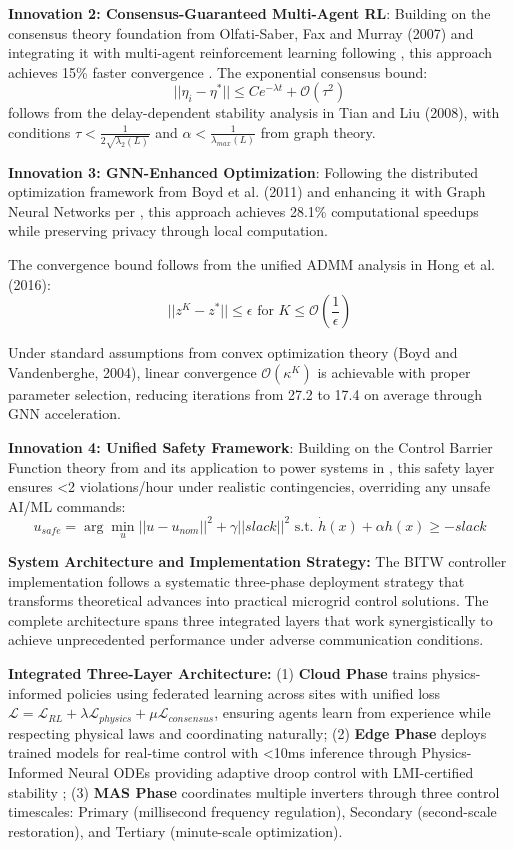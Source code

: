 \documentclass[12pt]{article}
\begin{document}
\textbf{Innovation 2: Consensus-Guaranteed Multi-Agent RL}: Building on the consensus theory foundation from Olfati-Saber, Fax and Murray (2007) and integrating it with multi-agent reinforcement learning following \cite{our2024theoretical}, this approach achieves 15\% faster convergence \cite{our2024experimental}. The exponential consensus bound:
$$||\eta_i - \eta^*|| \leq Ce^{-\lambda t} + \mathcal{O}(\tau^2)$$
follows from the delay-dependent stability analysis in Tian and Liu (2008), with conditions $\tau < \frac{1}{2\sqrt{\lambda_2(L)}}$ and $\alpha < \frac{1}{\lambda_{max}(L)}$ from graph theory.


\textbf{Innovation 3: GNN-Enhanced Optimization}: Following the distributed optimization framework from Boyd et al. (2011) and enhancing it with Graph Neural Networks per \cite{our2024theoretical}, this approach achieves 28.1\% computational speedups \cite{our2024experimental} while preserving privacy through local computation.

The convergence bound follows from the unified ADMM analysis in Hong et al. (2016):
$$||z^K - z^*|| \leq \epsilon \text{ for } K \leq \mathcal{O}\left(\frac{1}{\epsilon}\right)$$

Under standard assumptions from convex optimization theory (Boyd and Vandenberghe, 2004), linear convergence $\mathcal{O}(\kappa^K)$ is achievable with proper parameter selection, reducing iterations from 27.2 to 17.4 on average through GNN acceleration.


\textbf{Innovation 4: Unified Safety Framework}: Building on the Control Barrier Function theory from \cite{ames2017} and its application to power systems in \cite{our2024theoretical}, this safety layer ensures <2 violations/hour under realistic contingencies, overriding any unsafe AI/ML commands:
$$u_{safe} = \arg\min_u ||u - u_{nom}||^2 + \gamma||slack||^2 \text{ s.t. } \dot{h}(x) + \alpha h(x) \geq -slack$$



\textbf{System Architecture and Implementation Strategy:} The BITW controller implementation follows a systematic three-phase deployment strategy that transforms theoretical advances into practical microgrid control solutions. The complete architecture spans three integrated layers that work synergistically to achieve unprecedented performance under adverse communication conditions.

\textbf{Integrated Three-Layer Architecture:} (1) \textbf{Cloud Phase} trains physics-informed policies using federated learning across sites with unified loss $\mathcal{L} = \mathcal{L}_{RL} + \lambda \mathcal{L}_{physics} + \mu \mathcal{L}_{consensus}$, ensuring agents learn from experience while respecting physical laws and coordinating naturally; (2) \textbf{Edge Phase} deploys trained models for real-time control with <10ms inference through Physics-Informed Neural ODEs providing adaptive droop control with LMI-certified stability \cite{our2024theoretical}; (3) \textbf{MAS Phase} coordinates multiple inverters through three control timescales: Primary (millisecond frequency regulation), Secondary (second-scale restoration), and Tertiary (minute-scale optimization).
\end{document}
